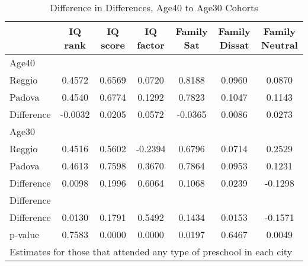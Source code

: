 \begin{table}[htbp]\centering
\caption{Difference in Differences, Age40 to Age30 Cohorts}
\begin{tabular}{l*{6}{c}}
\hline\hline
            &     IQ rank&    IQ score&   IQ factor&  Family Sat&Family Dissat&Family Neutral\\
\hline
Age40       &            &            &            &            &            &            \\
Reggio      &      0.4572&      0.6569&      0.0720&      0.8188&      0.0960&      0.0870\\
Padova      &      0.4540&      0.6774&      0.1292&      0.7823&      0.1047&      0.1143\\
Difference  &     -0.0032&      0.0205&      0.0572&     -0.0365&      0.0086&      0.0273\\
\hline
Age30       &            &            &            &            &            &            \\
Reggio      &      0.4516&      0.5602&     -0.2394&      0.6796&      0.0714&      0.2529\\
Padova      &      0.4613&      0.7598&      0.3670&      0.7864&      0.0953&      0.1231\\
Difference  &      0.0098&      0.1996&      0.6064&      0.1068&      0.0239&     -0.1298\\
\hline
Difference  &            &            &            &            &            &            \\
Difference  &      0.0130&      0.1791&      0.5492&      0.1434&      0.0153&     -0.1571\\
p-value     &      0.7583&      0.0000&      0.0000&      0.0197&      0.6467&      0.0049\\
\hline\hline
\multicolumn{7}{l}{\footnotesize Estimates for those that attended any type of preschool in each city}\\
\end{tabular}
\end{table}
